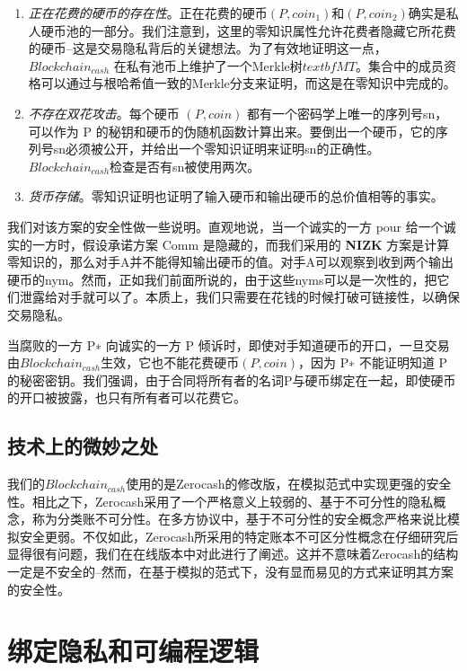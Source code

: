 \documentclass{xduugtrans}
\begin{document}
\begin{enumerate}
    \item \textit{正在花费的硬币的存在性}。正在花费的硬币$(P,coin_1)$和$(P,coin_2)$确实是私人硬币池的一部分。我们注意到，这里的零知识属性允许花费者隐藏它所花费的硬币--这是交易隐私背后的关键想法。为了有效地证明这一点，$Blockchain_{cash}$ 在私有池币上维护了一个Merkle树$textbf{MT}$。集合中的成员资格可以通过与根哈希值一致的Merkle分支来证明，而这是在零知识中完成的。
    \item \textit{不存在双花攻击}。每个硬币 $(P,coin)$ 都有一个密码学上唯一的序列号sn，可以作为 P 的秘钥和硬币的伪随机函数计算出来。要倒出一个硬币，它的序列号sn必须被公开，并给出一个零知识证明来证明sn的正确性。$Blockchain_{cash}$检查是否有sn被使用两次。
    \item \textit{货币存储}。零知识证明也证明了输入硬币和输出硬币的总价值相等的事实。
\end{enumerate}

我们对该方案的安全性做一些说明。直观地说，当一个诚实的一方 pour 给一个诚实的一方时，假设承诺方案 Comm 是隐藏的，而我们采用的 \textbf{NIZK} 方案是计算零知识的，那么对手A并不能得知输出硬币的值。对手A可以观察到收到两个输出硬币的nym。然而，正如我们前面所说的，由于这些nyms可以是一次性的，把它们泄露给对手就可以了。本质上，我们只需要在花钱的时候打破可链接性，以确保交易隐私。

当腐败的一方 P∗ 向诚实的一方 P 倾诉时，即使对手知道硬币的开口，一旦交易由$Blockchain_{cash}$生效，它也不能花费硬币$(P, coin)$，因为 P∗ 不能证明知道 P 的秘密密钥。我们强调，由于合同将所有者的名词P与硬币绑定在一起，即使硬币的开口被披露，也只有所有者可以花费它。

\subsection{技术上的微妙之处}

我们的$Blockchain_{cash}$使用的是Zerocash的修改版，在模拟范式中实现更强的安全性。相比之下，Zerocash采用了一个严格意义上较弱的、基于不可分性的隐私概念，称为分类账不可分性。在多方协议中，基于不可分性的安全概念严格来说比模拟安全更弱。不仅如此，Zerocash\cite{ref11}所采用的特定账本不可区分性概念在仔细研究后显得很有问题，我们在在线版本\cite{ref37}中对此进行了阐述。这并不意味着Zerocash的结构一定是不安全的--然而，在基于模拟的范式下，没有显而易见的方式来证明其方案的安全性。

\section{绑定隐私和可编程逻辑}
\end{document}
